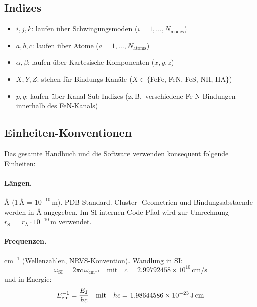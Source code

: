 \documentclass[11pt,a4paper,twoside]{article}
\providecommand{\angstrom}{\text{\AA}}    %
\theoremstyle{remark}
\begin{document}
\subsection{Indizes}

\begin{itemize}\setlength{\itemsep}{2pt}
  \item $i, j, k$: laufen \"uber Schwingungsmoden ($i = 1, \ldots,
        N_\text{modes}$)
  \item $a, b, c$: laufen \"uber Atome ($a = 1, \ldots, N_\text{atoms}$)
  \item $\alpha, \beta$: laufen \"uber Kartesische Komponenten
        ($x, y, z$)
  \item $X, Y, Z$: stehen f\"ur Bindungs-Kan\"ale
        ($X \in \{$FeFe, FeN, FeS, NH, HA$\}$)
  \item $p, q$: laufen \"uber Kanal-Sub-Indizes (z.\,B.\ verschiedene
        Fe-N-Bindungen innerhalb des FeN-Kanals)
\end{itemize}

\subsection{Einheiten-Konventionen}

Das gesamte Handbuch und die Software verwenden konsequent
folgende Einheiten:

\paragraph{L\"angen.}
$\angstrom$ (1\,$\angstrom$ = $10^{-10}$\,m). PDB-Standard. Cluster-
Geometrien und Bindungsabstaende werden in $\angstrom$ angegeben.
Im SI-internen Code-Pfad wird zur Umrechnung
$r_\text{SI} = r_{\angstrom} \cdot 10^{-10}$\,m verwendet.

\paragraph{Frequenzen.}
cm$^{-1}$ (Wellenzahlen, NRVS-Konvention). Wandlung in SI:
\begin{equation}
  \omega_\text{SI} = 2\pi c\,\omega_{\text{cm}^{-1}}
  \quad\text{mit}\quad c = 2.99792458 \times 10^{10}\,\text{cm/s}
\end{equation}
und in Energie:
\begin{equation}
  E_\text{cm}^{-1} = \frac{E_\text{J}}{h c}
  \quad\text{mit}\quad h c = 1.98644586 \times 10^{-23}\,\text{J\,cm}
\end{equation}
\end{document}
